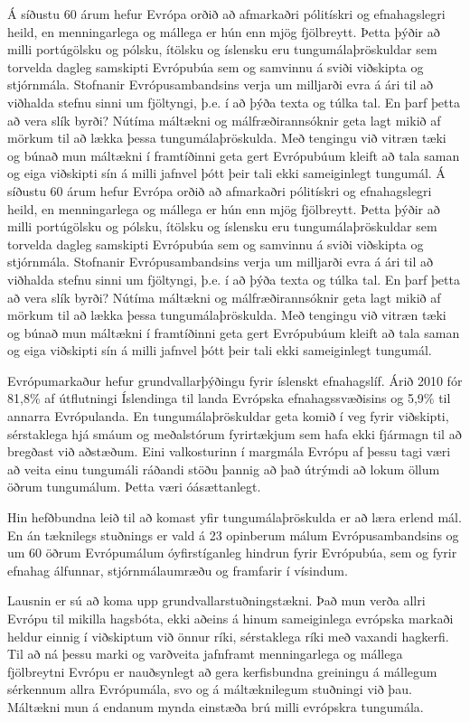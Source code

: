 \documentclass{../../metanetpaper}
\begin{document}
\begin{multicols}{2}
Á síðustu 60 árum hefur Evrópa orðið að afmarkaðri pólitískri og efnahagslegri heild, en menningarlega og mállega er hún enn mjög fjölbreytt. Þetta þýðir að milli portúgölsku og pólsku, ítölsku og íslensku eru tungumálaþröskuldar sem torvelda dagleg samskipti Evrópubúa sem og samvinnu á sviði viðskipta og stjórnmála. Stofnanir Evrópusambandsins verja um milljarði evra á ári til að viðhalda stefnu sinni um fjöltyngi, þ.e. í að þýða texta og túlka tal. En þarf þetta að vera slík byrði? Nútíma máltækni og málfræðirannsóknir geta lagt mikið af mörkum til að lækka þessa tungumálaþröskulda. Með tengingu við vitræn tæki og búnað mun máltækni í framtíðinni geta gert Evrópubúum kleift að tala saman og eiga viðskipti sín á milli jafnvel þótt þeir tali ekki sameiginlegt tungumál. Á síðustu 60 árum hefur Evrópa orðið að afmarkaðri pólitískri og efnahagslegri heild, en menningarlega og mállega er hún enn mjög fjölbreytt. Þetta þýðir að milli portúgölsku og pólsku, ítölsku og íslensku eru tungumálaþröskuldar sem torvelda dagleg samskipti Evrópubúa sem og samvinnu á sviði viðskipta og stjórnmála. Stofnanir Evrópusambandsins verja um milljarði evra á ári til að viðhalda stefnu sinni um fjöltyngi, þ.e. í að þýða texta og túlka tal. En þarf þetta að vera slík byrði? Nútíma máltækni og málfræðirannsóknir geta lagt mikið af mörkum til að lækka þessa tungumálaþröskulda. Með tengingu við vitræn tæki og búnað mun máltækni í framtíðinni geta gert Evrópubúum kleift að tala saman og eiga viðskipti sín á milli jafnvel þótt þeir tali ekki sameiginlegt tungumál.

Evrópumarkaður hefur grundvallarþýðingu fyrir íslenskt efnahagslíf. Árið 2010 fór 81,8\% af útflutningi Íslendinga til landa Evrópska efnahagssvæðisins og 5,9\% til annarra Evrópulanda\cite{hag3}. En tungumálaþröskuldar geta komið í veg fyrir viðskipti, sérstaklega hjá smáum og meðalstórum fyrirtækjum sem hafa ekki fjármagn til að bregðast við aðstæðum. Eini valkosturinn í margmála Evrópu af þessu tagi væri að veita einu tungumáli ráðandi stöðu þannig að það útrýmdi að lokum öllum öðrum tungumálum. Þetta væri óásættanlegt.

Hin hefðbundna leið til að komast yfir tungumálaþröskulda er að læra erlend mál. En án tæknilegs stuðnings er vald á 23 opinberum málum Evrópusambandsins og um 60 öðrum Evrópumálum óyfirstíganleg hindrun fyrir Evrópubúa, sem og fyrir efnahag álfunnar, stjórnmálaumræðu og framfarir í vísindum.

Lausnin er sú að koma upp grundvallarstuðningstækni. Það mun verða allri Evrópu til mikilla hagsbóta, ekki aðeins á hinum sameiginlega evrópska markaði heldur einnig í viðskiptum við önnur ríki, sérstaklega ríki með vaxandi hagkerfi. Til að ná þessu marki og varðveita jafnframt menningarlega og mállega fjölbreytni Evrópu er nauðsynlegt að gera kerfisbundna greiningu á mállegum sérkennum allra Evrópumála, svo og á máltæknilegum stuðningi við þau. Máltækni mun á endanum mynda einstæða brú milli evrópskra tungumála.


\end{multicols}
\end{document}
